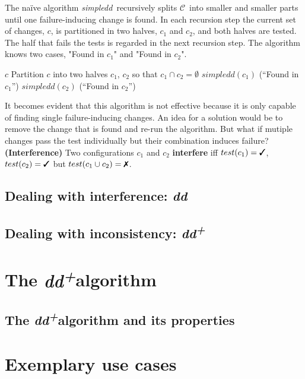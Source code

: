 \documentclass[a4paper,UKenglish]{lipics-v2018}
\newcommand{\sdd}[0]{\textit{simpledd}}
\newcommand{\dd}[0]{\textit{dd}}
\newcommand{\ddp}{\textit{dd\textsuperscript{+}}}
\newcommand{\C}[0]{\ensuremath{\mathcal{C}}}
\newcommand{\cmark}{\text{\ding{51}}}
\newcommand{\xmark}{\text{\ding{55}}}
\newcommand{\defsub}[1]{\textbf{(#1)} }
\begin{document}
The na\"ive algorithm \sdd\ recursively splits \C\ into smaller and smaller parts until one failure-inducing change is found. In each recursion step the current set of changes, $c$, is partitioned in two halves, $c_1$ and $c_2$, and both halves are tested. The half that fails the tests is regarded in the next recursion step. The algorithm knows two cases, "Found in $c_1$" and "Found in $c_2$". \\

\begin{algorithmic}[1]
		\Function{simpledd}{$c: 2^{\C}$}
			 \Return $c$ \EndIf
			\State Partition $c$ into two halves $c_1$, $c_2$ so that $c_1 \cap c_2 = \emptyset$
			\If{($test(c_1) = \xmark$)} \Return $simpledd(c_1)$ \Comment(``Found in $c_1$'') \Else{} \Return $simpledd(c_2)$ \Comment(``Found in $c_2$'')
			\EndIf
		\EndFunction
\end{algorithmic}

It becomes evident that this algorithm is not effective because it is only capable of finding single failure-inducing changes. An idea for a solution would be to remove the change that is found and re-run the algorithm. But what if mutiple changes pass the test individually but their combination induces failure? \\

 \defsub{Interference} Two configurations $c_1$ and $c_2$ \textbf{interfere} iff $test(c_1) = \cmark$, $test(c_2) = \cmark$ but $test(c_1 \cup c_2) = \xmark$.

\subsection{Dealing with interference: \dd}

\subsection{Dealing with inconsistency: \ddp}

\section{The \ddp algorithm}
\subsection{The \ddp algorithm and its properties}

\section{Exemplary use cases}
\end{document}
